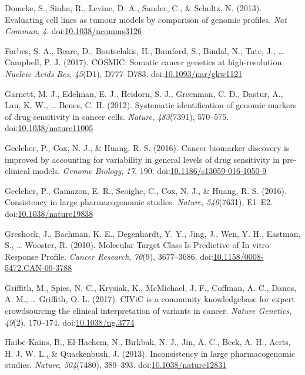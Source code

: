 \documentclass[man,floatsintext]{apa6}
\begin{document}
\hypertarget{ref-domcke2013}{}
Domcke, S., Sinha, R., Levine, D. A., Sander, C., \& Schultz, N. (2013).
Evaluating cell lines as tumour models by comparison of genomic
profiles. \emph{Nat Commun}, \emph{4}.
doi:\href{https://doi.org/10.1038/ncomms3126}{10.1038/ncomms3126}

\hypertarget{ref-forbes2017}{}
Forbes, S. A., Beare, D., Boutselakis, H., Bamford, S., Bindal, N.,
Tate, J., \ldots{} Campbell, P. J. (2017). COSMIC: Somatic cancer
genetics at high-resolution. \emph{Nucleic Acids Res}, \emph{45}(D1),
D777--D783.
doi:\href{https://doi.org/10.1093/nar/gkw1121}{10.1093/nar/gkw1121}

\hypertarget{ref-garnett2012}{}
Garnett, M. J., Edelman, E. J., Heidorn, S. J., Greenman, C. D., Dastur,
A., Lau, K. W., \ldots{} Benes, C. H. (2012). Systematic identification
of genomic markers of drug sensitivity in cancer cells. \emph{Nature},
\emph{483}(7391), 570--575.
doi:\href{https://doi.org/10.1038/nature11005}{10.1038/nature11005}

\hypertarget{ref-geeleher2016}{}
Geeleher, P., Cox, N. J., \& Huang, R. S. (2016). Cancer biomarker
discovery is improved by accounting for variability in general levels of
drug sensitivity in pre-clinical models. \emph{Genome Biology},
\emph{17}, 190.
doi:\href{https://doi.org/10.1186/s13059-016-1050-9}{10.1186/s13059-016-1050-9}

\hypertarget{ref-geeleher2016a}{}
Geeleher, P., Gamazon, E. R., Seoighe, C., Cox, N. J., \& Huang, R. S.
(2016). Consistency in large pharmacogenomic studies. \emph{Nature},
\emph{540}(7631), E1--E2.
doi:\href{https://doi.org/10.1038/nature19838}{10.1038/nature19838}

\hypertarget{ref-greshock2010}{}
Greshock, J., Bachman, K. E., Degenhardt, Y. Y., Jing, J., Wen, Y. H.,
Eastman, S., \ldots{} Wooster, R. (2010). Molecular Target Class Is
Predictive of In vitro Response Profile. \emph{Cancer Research},
\emph{70}(9), 3677--3686.
doi:\href{https://doi.org/10.1158/0008-5472.CAN-09-3788}{10.1158/0008-5472.CAN-09-3788}

\hypertarget{ref-griffith2017}{}
Griffith, M., Spies, N. C., Krysiak, K., McMichael, J. F., Coffman, A.
C., Danos, A. M., \ldots{} Griffith, O. L. (2017). CIViC is a community
knowledgebase for expert crowdsourcing the clinical interpretation of
variants in cancer. \emph{Nature Genetics}, \emph{49}(2), 170--174.
doi:\href{https://doi.org/10.1038/ng.3774}{10.1038/ng.3774}

\hypertarget{ref-haibe-kains2013}{}
Haibe-Kains, B., El-Hachem, N., Birkbak, N. J., Jin, A. C., Beck, A. H.,
Aerts, H. J. W. L., \& Quackenbush, J. (2013). Inconsistency in large
pharmacogenomic studies. \emph{Nature}, \emph{504}(7480), 389--393.
doi:\href{https://doi.org/10.1038/nature12831}{10.1038/nature12831}
\end{document}
